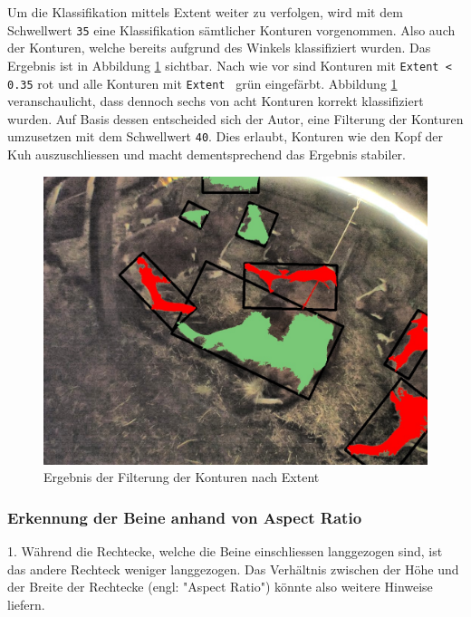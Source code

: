 Um die Klassifikation mittels Extent weiter zu verfolgen, wird mit dem Schwellwert \texttt{35} eine Klassifikation sämtlicher Konturen vorgenommen. Also auch der Konturen, welche bereits aufgrund des Winkels klassifiziert wurden. Das Ergebnis ist in Abbildung \ref{fig: Ergebnis der Filterung der Konturen nach Extent} sichtbar. Nach wie vor sind Konturen mit \texttt{Extent < 0.35} rot und alle Konturen mit \texttt{Extent } grün eingefärbt. Abbildung \ref{fig: Ergebnis der Filterung der Konturen nach Extent} veranschaulicht, dass dennoch sechs von acht Konturen korrekt klassifiziert wurden. Auf Basis dessen entscheided sich der Autor, eine Filterung der Konturen umzusetzen mit dem Schwellwert  \texttt{40}. Dies erlaubt, Konturen wie den Kopf der Kuh auszuschliessen und macht dementsprechend das Ergebnis stabiler.
\begin{figure}[H]
	\center
	\includegraphics[scale=0.43]{Grafiken/entwicklung/26ExtentDemonstration.jpg}
	\caption{Ergebnis der Filterung der Konturen nach Extent } 
	\label{fig: Ergebnis der Filterung der Konturen nach Extent} 
\end{figure}
\subsubsection{Erkennung der Beine anhand von Aspect Ratio}
1. Während die Rechtecke, welche die Beine einschliessen langgezogen sind, ist das andere Rechteck weniger langgezogen. Das Verhältnis zwischen der Höhe und der Breite der Rechtecke (engl: "Aspect Ratio") könnte also weitere Hinweise liefern.	
	


